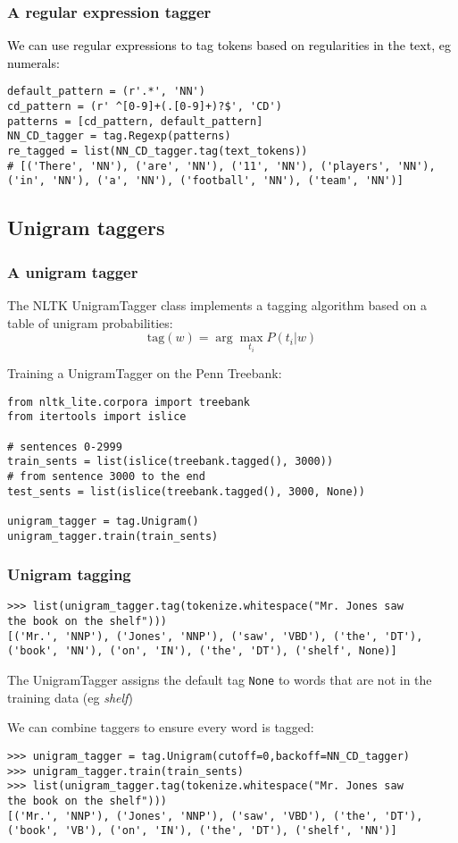 \documentclass{beamer}             %
\begin{document}
\begin{frame}[fragile]
  \frametitle{A regular expression tagger}
\textcolor{black}{
We can use regular expressions to tag tokens based on regularities in
the text, eg numerals:}
\small
\begin{verbatim}
default_pattern = (r'.*', 'NN')
cd_pattern = (r' ^[0-9]+(.[0-9]+)?$', 'CD')
patterns = [cd_pattern, default_pattern]
NN_CD_tagger = tag.Regexp(patterns)
re_tagged = list(NN_CD_tagger.tag(text_tokens))
# [('There', 'NN'), ('are', 'NN'), ('11', 'NN'), ('players', 'NN'), 
('in', 'NN'), ('a', 'NN'), ('football', 'NN'), ('team', 'NN')]
\end{verbatim}
\end{frame}


\subsection{Unigram taggers} 

\begin{frame}[fragile]
  \frametitle{A unigram tagger}
The NLTK UnigramTagger class implements a tagging algorithm based on a
table of unigram probabilities:
\[ \mbox{tag}(w) = \arg\max_{t_i} P(t_i|w) \]

\pause
Training a UnigramTagger on the Penn Treebank:
{\small
\begin{verbatim}
from nltk_lite.corpora import treebank
from itertools import islice

# sentences 0-2999
train_sents = list(islice(treebank.tagged(), 3000))
# from sentence 3000 to the end
test_sents = list(islice(treebank.tagged(), 3000, None))

unigram_tagger = tag.Unigram()
unigram_tagger.train(train_sents)
\end{verbatim}}
\end{frame}



\begin{frame}[fragile]
  \frametitle{Unigram tagging}
{\small
\begin{verbatim}
>>> list(unigram_tagger.tag(tokenize.whitespace("Mr. Jones saw 
the book on the shelf")))
[('Mr.', 'NNP'), ('Jones', 'NNP'), ('saw', 'VBD'), ('the', 'DT'), 
('book', 'NN'), ('on', 'IN'), ('the', 'DT'), ('shelf', None)]
\end{verbatim}}

  The UnigramTagger assigns the default tag \texttt{None} to words
  that are not in the training data (eg \emph{shelf})

  \pause
  We can combine taggers to ensure every word is tagged:
{\small
\begin{verbatim}
>>> unigram_tagger = tag.Unigram(cutoff=0,backoff=NN_CD_tagger)
>>> unigram_tagger.train(train_sents)
>>> list(unigram_tagger.tag(tokenize.whitespace("Mr. Jones saw 
the book on the shelf")))
[('Mr.', 'NNP'), ('Jones', 'NNP'), ('saw', 'VBD'), ('the', 'DT'), 
('book', 'VB'), ('on', 'IN'), ('the', 'DT'), ('shelf', 'NN')]
\end{verbatim}}
\end{frame}
\end{document}
